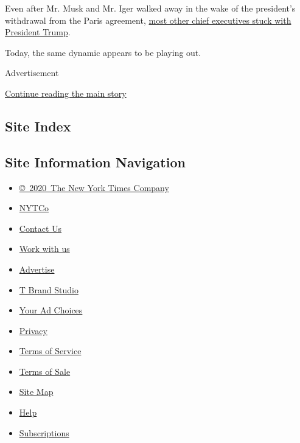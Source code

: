 Even after Mr. Musk and Mr. Iger walked away in the wake of the
president's withdrawal from the Paris agreement,
\href{https://www.nytimes.com/interactive/2017/06/02/opinion/trump-paris-climate-reacts-advisors.html}{most
other chief executives stuck with President Trump}.

Today, the same dynamic appears to be playing out.

Advertisement

\protect\hyperlink{after-bottom}{Continue reading the main story}

\hypertarget{site-index}{%
\subsection{Site Index}\label{site-index}}

\hypertarget{site-information-navigation}{%
\subsection{Site Information
Navigation}\label{site-information-navigation}}

\begin{itemize}
\tightlist
\item
  \href{https://help.nytimes.com/hc/en-us/articles/115014792127-Copyright-notice}{©~2020~The
  New York Times Company}
\end{itemize}

\begin{itemize}
\tightlist
\item
  \href{https://www.nytco.com/}{NYTCo}
\item
  \href{https://help.nytimes.com/hc/en-us/articles/115015385887-Contact-Us}{Contact
  Us}
\item
  \href{https://www.nytco.com/careers/}{Work with us}
\item
  \href{https://nytmediakit.com/}{Advertise}
\item
  \href{http://www.tbrandstudio.com/}{T Brand Studio}
\item
  \href{https://www.nytimes.com/privacy/cookie-policy\#how-do-i-manage-trackers}{Your
  Ad Choices}
\item
  \href{https://www.nytimes.com/privacy}{Privacy}
\item
  \href{https://help.nytimes.com/hc/en-us/articles/115014893428-Terms-of-service}{Terms
  of Service}
\item
  \href{https://help.nytimes.com/hc/en-us/articles/115014893968-Terms-of-sale}{Terms
  of Sale}
\item
  \href{https://spiderbites.nytimes.com}{Site Map}
\item
  \href{https://help.nytimes.com/hc/en-us}{Help}
\item
  \href{https://www.nytimes.com/subscription?campaignId=37WXW}{Subscriptions}
\end{itemize}
